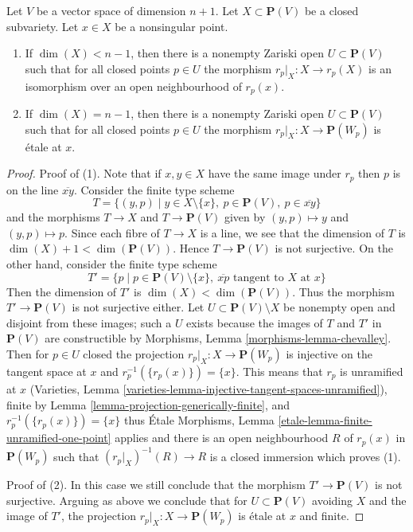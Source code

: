\begin{lemma}
\label{lemma-projection-generically-immersion}
Let $V$ be a vector space of dimension $n + 1$.
Let $X \subset \mathbf{P}(V)$ be a closed subvariety.
Let $x \in X$ be a nonsingular point.
\begin{enumerate}
\item If $\dim(X) < n - 1$, then there is a nonempty Zariski open
$U \subset \mathbf{P}(V)$ such that for all closed points $p \in U$ the
morphism $r_p|_X : X \to r_p(X)$ is an
isomorphism over an open neighbourhood of $r_p(x)$.
\item If $\dim(X) = n - 1$, then there is a nonempty Zariski open
$U \subset \mathbf{P}(V)$ such that for all closed points $p \in U$ the
morphism $r_p|_X : X \to \mathbf{P}(W_p)$ is \'etale at $x$.
\end{enumerate}
\end{lemma}

\begin{proof}
Proof of (1). Note that if $x, y \in X$ have the same image under
$r_p$ then $p$ is on the line $\overline{xy}$.
Consider the finite type scheme
$$
T = \{(y, p) \mid
y \in X \setminus \{x\},\ p \in \mathbf{P}(V),\ p \in \overline{xy}\}
$$
and the morphisms $T \to X$ and $T \to \mathbf{P}(V)$ given by
$(y, p) \mapsto y$ and $(y, p) \mapsto p$.
Since each fibre of $T \to X$ is a line, we see that
the dimension of $T$ is $\dim(X) + 1 < \dim(\mathbf{P}(V))$.
Hence $T \to \mathbf{P}(V)$ is not surjective. On the other hand,
consider the finite type scheme
$$
T' = \{p \mid
p \in \mathbf{P}(V) \setminus \{x\},
\ \overline{xp}\text{ tangent to }X\text{ at }x\}
$$
Then the dimension of $T'$ is $\dim(X) < \dim(\mathbf{P}(V))$.
Thus the morphism $T' \to \mathbf{P}(V)$ is not surjective either.
Let $U \subset \mathbf{P}(V) \setminus X$ be nonempty open and disjoint
from these images; such a $U$ exists because the images of $T$ and $T'$
in $\mathbf{P}(V)$ are constructible by
Morphisms, Lemma \ref{morphisms-lemma-chevalley}.
Then for $p \in U$ closed the projection
$r_p|_X : X \to \mathbf{P}(W_p)$ is injective on the
tangent space at $x$ and $r_p^{-1}(\{r_p(x)\}) = \{x\}$.
This means that $r_p$ is unramified at $x$
(Varieties, Lemma \ref{varieties-lemma-injective-tangent-spaces-unramified}),
finite by Lemma \ref{lemma-projection-generically-finite},
and $r_p^{-1}(\{r_p(x)\}) = \{x\}$ thus \'Etale Morphisms, Lemma
\ref{etale-lemma-finite-unramified-one-point} applies and
there is an open neighbourhood $R$ of $r_p(x)$
in $\mathbf{P}(W_p)$ such that $(r_p|_X)^{-1}(R) \to R$ is a
closed immersion which proves (1).

\medskip\noindent
Proof of (2). In this case we still conclude that the morphism
$T' \to \mathbf{P}(V)$ is not surjective.
Arguing as above we conclude that for $U \subset \mathbf{P}(V)$
avoiding $X$ and the image of $T'$, the projection
$r_p|_X : X \to \mathbf{P}(W_p)$ is \'etale at $x$ and finite.
\end{proof}

